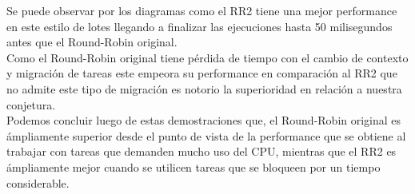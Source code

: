  Se puede observar por los diagramas como el RR2 tiene una mejor performance en este estilo
 de lotes llegando a finalizar las ejecuciones hasta 50 milisegundos antes que el Round-Robin
 original.\\
 Como el Round-Robin original tiene pérdida de tiempo con el cambio de contexto y
 migración de tareas este empeora su performance en comparación al RR2 que no admite
 este tipo de migración es notorio la superioridad en relación a nuestra conjetura.\\
 
 Podemos concluir luego de estas demostraciones que, el Round-Robin original es \'{a}mpliamente
 superior desde el punto de vista de la performance que se obtiene al trabajar con tareas
 que demanden mucho uso del CPU, mientras que el RR2 es \'{a}mpliamente mejor cuando se utilicen
 tareas que se bloqueen por un tiempo considerable.\\
 

